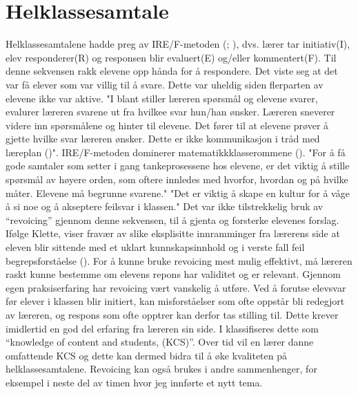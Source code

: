 \documentclass[12pt,twoside,onecolumn,norsk]{article}
\begin{document}
\section*{Helklassesamtale}
Helklassesamtalene hadde preg av
IRE/F-metoden (; ), dvs. lærer tar initiativ(I), elev 
responderer(R) og responsen blir evaluert(E) og/eller kommentert(F). Til denne sekvensen rakk 
elevene opp hånda for å respondere. Det viste seg at det var få elever som var villig til å svare. 
Dette var uheldig siden flerparten av elevene ikke var aktive. "I blant stiller læreren spørsmål og
elevene svarer, evalurer læreren svarene ut fra hvilkee svar hun/han ønsker. Læreren sneverer videre
inn spørsmålene og hinter til elevene. Det fører til at elevene prøver å gjette hvilke svar læreren
ønsker. Dette er ikke kommunikasjon i tråd med læreplan ()". IRE/F-metoden
dominerer matematikkklasserommene (). "For å få gode samtaler som setter i
gang tankeprosessene hos elevene, er det viktig å stille spørsmål av høyere orden, som oftere
innledes med hvorfor, hvordan og på hvilke måter. Elevene må begrunne svarene." "Det er viktig
å skape en kultur for å våge å si noe og å akseptere feilsvar i klassen."
\newline
\newline
Det var ikke tilstrekkelig bruk av ``revoicing'' gjennom denne sekvensen, til å gjenta og 
forsterke elevenes forslag.  Ifølge Klette, viser fravær av slike eksplisitte 
innramminger fra lærerens side at eleven blir sittende med et uklart kunnskapsinnhold og i 
verste fall feil begrepsforståelse (). For å kunne bruke revoicing 
mest mulig effektivt, må læreren raskt kunne bestemme om elevens repons har validitet 
og er relevant. Gjennom egen praksiserfaring har revoicing vært vanskelig å utføre.
Ved å forutse elevsvar før elever i klassen blir initiert, kan misforståelser som ofte oppstår bli 
redegjort av læreren, og respons som ofte opptrer kan derfor tas stilling til. Dette krever imidlertid 
en god del erfaring fra læreren sin side. I  klassifiseres dette som 
``knowledge of content and students, (KCS)''. Over tid vil en lærer danne omfattende KCS og
dette kan dermed bidra til å øke kvaliteten på helklassesamtalene. Revoicing kan også brukes
i andre sammenhenger, for eksempel i neste del av timen hvor jeg innførte et nytt tema. 
\newline
\newline
\end{document}
